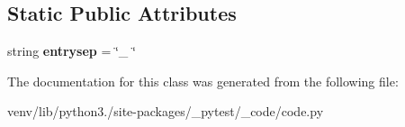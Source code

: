 \subsection*{Static Public Attributes}
\begin{DoxyCompactItemize}
\item 
\mbox{\label{class__pytest_1_1__code_1_1code_1_1_repr_traceback_ac8dcafebb80eadd4d97729f6d57df924}} 
string {\bfseries entrysep} = \char`\"{}\+\_\+ \char`\"{}
\end{DoxyCompactItemize}


The documentation for this class was generated from the following file\+:\begin{DoxyCompactItemize}
\item 
venv/lib/python3./site-\/packages/\+\_\+pytest/\+\_\+code/code.\+py\end{DoxyCompactItemize}
